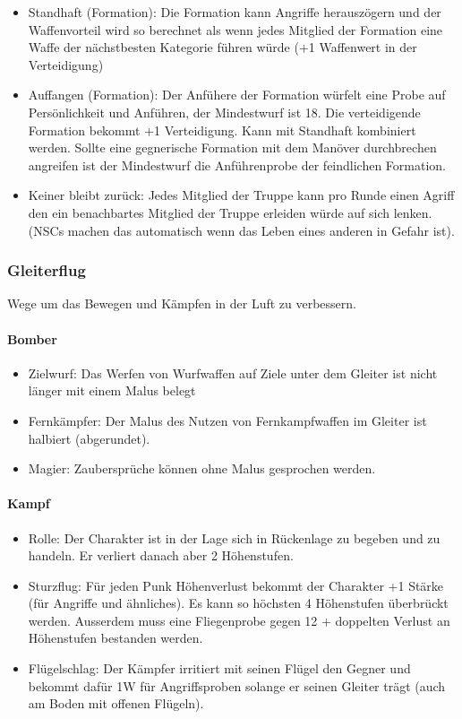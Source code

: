 \documentclass{article}
\begin{document}
\begin{itemize}
\item Standhaft (Formation): Die Formation kann Angriffe herauszögern und der Waffenvorteil wird so berechnet als wenn jedes Mitglied der Formation eine Waffe der nächstbesten Kategorie führen würde (+1 Waffenwert in der Verteidigung)
\item Auffangen (Formation): Der Anfühere der Formation würfelt eine Probe auf Persönlichkeit und Anführen, der Mindestwurf ist 18. Die verteidigende Formation bekommt +1 Verteidigung. Kann mit Standhaft kombiniert werden. Sollte eine gegnerische Formation mit dem Manöver durchbrechen angreifen ist der Mindestwurf die Anführenprobe der feindlichen Formation.
\item Keiner bleibt zurück: Jedes Mitglied der Truppe kann pro Runde einen Agriff den ein benachbartes Mitglied der Truppe erleiden würde auf sich lenken. (NSCs machen das automatisch wenn das Leben eines anderen in Gefahr ist).
\end{itemize}

\subsubsection{Gleiterflug}

Wege um das Bewegen und Kämpfen in der Luft zu verbessern.

\paragraph{Bomber}

\begin{itemize}
\item Zielwurf: Das Werfen von Wurfwaffen auf Ziele unter dem Gleiter ist nicht länger mit einem Malus belegt
\item Fernkämpfer: Der Malus des Nutzen von Fernkampfwaffen im Gleiter ist halbiert (abgerundet).
\item Magier: Zaubersprüche können ohne Malus gesprochen werden.
\end{itemize}

\paragraph{Kampf}

\begin{itemize}
\item Rolle: Der Charakter ist in der Lage sich in Rückenlage zu begeben und zu handeln. Er verliert danach aber 2 Höhenstufen.
\item Sturzflug: Für jeden Punk Höhenverlust bekommt der Charakter +1 Stärke (für Angriffe und ähnliches). Es kann so höchsten 4 Höhenstufen überbrückt werden. Ausserdem muss eine Fliegenprobe gegen 12 + doppelten Verlust an Höhenstufen bestanden werden.
\item Flügelschlag: Der Kämpfer irritiert mit seinen Flügel den Gegner und bekommt dafür 1W für Angriffsproben solange er seinen Gleiter trägt (auch am Boden mit offenen Flügeln).
\end{itemize}
\end{document}
